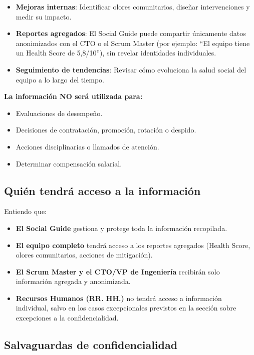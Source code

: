 \begin{itemize}
    \item \textbf{Mejoras internas}: Identificar olores comunitarios, diseñar intervenciones y medir su impacto.
    \item \textbf{Reportes agregados}: El Social Guide puede compartir únicamente datos anonimizados con el CTO o el Scrum Master (por ejemplo: ``El equipo tiene un Health Score de 5,8/10''), sin revelar identidades individuales.
    \item \textbf{Seguimiento de tendencias}: Revisar cómo evoluciona la salud social del equipo a lo largo del tiempo.
\end{itemize}

\textbf{La información NO será utilizada para:}

\begin{itemize}
    \item Evaluaciones de desempeño.
    \item Decisiones de contratación, promoción, rotación o despido.
    \item Acciones disciplinarias o llamados de atención.
    \item Determinar compensación salarial.
\end{itemize}

\subsection{Quién tendrá acceso a la información}

Entiendo que:

\begin{itemize}
    \item \textbf{El Social Guide} gestiona y protege toda la información recopilada.
    \item \textbf{El equipo completo} tendrá acceso a los reportes agregados (Health Score, olores comunitarios, acciones de mitigación).
    \item \textbf{El Scrum Master y el CTO/VP de Ingeniería} recibirán solo información agregada y anonimizada.
    \item \textbf{Recursos Humanos (RR. HH.)} no tendrá acceso a información individual, salvo en los casos excepcionales previstos en la sección sobre excepciones a la confidencialidad.
\end{itemize}

\subsection{Salvaguardas de confidencialidad}


